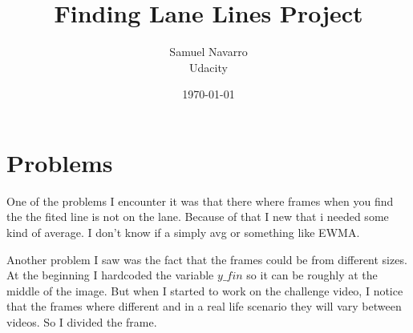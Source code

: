 \documentclass[11pt, a4paper]{article}
\begin{document}
\title{Finding Lane Lines Project}
\author{Samuel Navarro \\ Udacity}
\date{\today}
\maketitle
	

	\section{Problems}%
	\label{sec:problems}
	
	One of the problems I encounter it was that there where frames when you find the the fited line is not on the lane. Because of that I new that i needed some kind of average. I don't know if a simply avg or something like EWMA.



	Another problem I saw was the fact that the frames could be from different sizes. At the beginning I hardcoded the variable $y\_fin$ so it can be roughly at the middle of the image. But when I started to work on the challenge video, I notice that the frames where different and in a real life scenario they will vary between videos. So I divided the frame.



	
\end{document}
